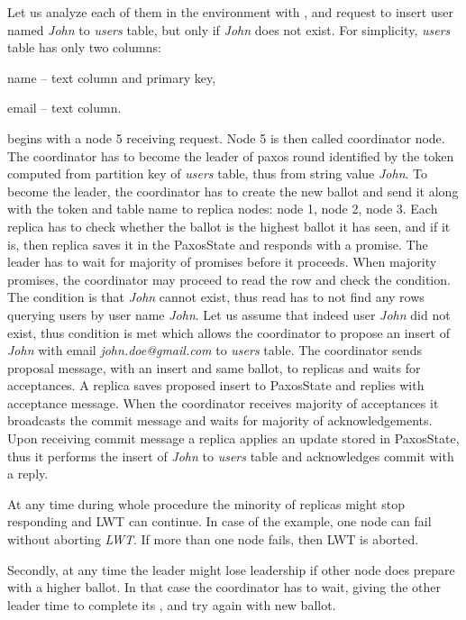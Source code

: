 Let us analyze each of them in the environment with ,  and request to insert user named \emph{John} to \emph{users} table, but only if \emph{John} does not exist. For simplicity, \emph{users} table has only two columns: \begin{enumerate*}[label=\alph*)]
\item name -- text column and primary key, \item email -- text column. \end{enumerate*} \lwt begins with a node 5 receiving request. Node 5 is then called coordinator node. The coordinator has to become the leader of paxos round identified by the token computed from partition key of \emph{users} table, thus from string value \emph{John}. To become the leader, the coordinator has to create the new ballot and send it along with the token and table name to replica nodes: node 1, node 2, node 3. Each replica has to check whether the ballot is the highest ballot it has seen, and if it is, then replica saves it in the PaxosState and responds with a promise. The leader has to wait for majority of promises before it proceeds. When majority promises, the coordinator may proceed to read the row and check the condition. The condition is that \emph{John} cannot exist, thus read has to not find any rows querying users by user name \emph{John}. Let us assume that indeed user \emph{John} did not exist, thus condition is met which allows the coordinator to propose an insert of \emph{John} with email \emph{john.doe@gmail.com} to \emph{users} table. The coordinator sends proposal message, with an insert and same ballot, to replicas and waits for acceptances. A replica saves proposed insert to PaxosState and replies with acceptance message.
When the coordinator receives majority of acceptances it broadcasts the commit message and waits for majority of acknowledgements. Upon receiving commit message a replica applies an update stored in PaxosState, thus it performs the insert of \emph{John} to \emph{users} table and acknowledges commit with a reply.

At any time during whole procedure the minority of replicas might stop responding and LWT can continue. In case of the example, one node can fail without aborting \emph{LWT}. If more than one node fails, then LWT is aborted. 

Secondly, at any time the leader might lose leadership if other node does prepare with a higher ballot. In that case the coordinator has to wait, giving the other leader time to complete its \lwt, and try again with new ballot.

